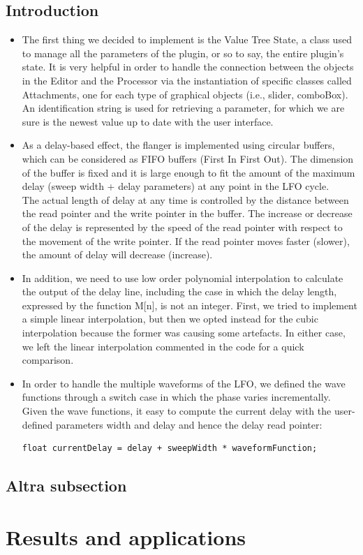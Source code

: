 \documentclass[a4paper,12pt]{report}
\begin{document}
\subsection{Introduction}
\begin{itemize}
\item[\textasteriskcentered]The first thing we decided to implement is the Value Tree State, a class used to manage all the parameters of the plugin, or so to say, the entire plugin’s state. It is very helpful in order to handle the connection between the objects in the Editor and the Processor via the instantiation of specific classes called Attachments, one for each type of graphical objects (i.e., slider, comboBox). An identification string is used for retrieving a parameter, for which we are sure is the newest value up to date with the user interface.  
\item[\textasteriskcentered] As a delay-based effect, the flanger is implemented using circular buffers, which can be considered as FIFO buffers (First In First Out). The dimension of the buffer is fixed and it is large enough to fit the amount of the maximum delay (sweep width + delay parameters) at any point in the LFO cycle.
\\The actual length of delay at any time is controlled by the distance between the read pointer and the write pointer in the buffer. The increase or decrease of the delay is represented by the speed of the read pointer with respect to the movement of the write pointer. If the read pointer moves faster (slower), the amount of delay will decrease (increase).
\item[\textasteriskcentered] In addition, we need to use low order polynomial interpolation to calculate the output of the delay line, including the case in which the delay length, expressed by the function M[n], is not an integer. First, we tried to implement a simple linear interpolation, but then we opted instead for the cubic interpolation because the former was causing some artefacts. In either case, we left the linear interpolation commented in the code for a quick comparison. 
\item[\textasteriskcentered] In order to handle the multiple waveforms of the LFO, we defined the wave functions through a switch case in which the phase varies incrementally. Given the wave functions, it easy to compute the current delay with the user-defined parameters width and delay and hence the delay read pointer:
\begin{verbatim}
float currentDelay = delay + sweepWidth * waveformFunction;
\end{verbatim}
\end{itemize}
\subsection{Altra subsection}
\section{Results and applications}

\begin{verbatim}

\end{verbatim}


\begin{verbatim}

\end{verbatim}
\end{document}
